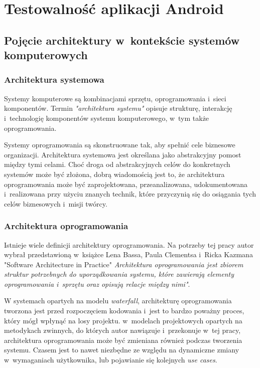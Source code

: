 \chapter{Testowalność aplikacji Android}
\label{opis_problemu}

\section{Pojęcie architektury w~kontekście systemów \newline komputerowych}
\subsection{Architektura systemowa}
Systemy komputerowe są kombinacjami sprzętu, oprogramowania i~sieci komponentów. Termin \textit{"architektura systemu"} opisuje strukturę, interakcję i~technologię komponentów systemu komputerowego, w~tym także oprogramowania.

Systemy oprogramowania są skonstruowane tak, aby spełnić cele biznesowe organizacji. Architektura systemowa jest określana jako abstrakcyjny pomost między tymi celami. Choć droga od abstrakcyjnych celów do konkretnych systemów może być złożona, dobrą wiadomością jest to, że architektura oprogramowania może być zaprojektowana, przeanalizowana, udokumentowana i~realizowana przy użyciu znanych technik, które przyczynią się do osiągania tych celów biznesowych i~misji twórcy. 


\subsection{Architektura oprogramowania}
Istnieje wiele definicji architektury oprogramowania. Na potrzeby tej pracy autor wybrał przedstawioną w~książce Lena Bassa, Paula Clementsa i~Ricka Kazmana "Software Architecture in Practice"\cite{bib:architect:software} \textit{Architektura oprogramowania jest zbiorem struktur potrzebnych do uporządkowania systemu, które zawierają elementy oprogramowania i~sprzętu oraz opisują relacje między nimi"}. 

W systemach opartych na modelu \textit{waterfall}, architekturę oprogramowania tworzona jest przed rozpoczęciem kodowania i~jest to bardzo poważny proces, który mógł wpłynąć na losy projektu. w~modelach projektowych opartych na metodykach zwinnych, do których autor nawiązuje i~przekonuje w~tej pracy, architektura oprogramowania może być zmieniana również podczas tworzenia systemu. Czasem jest to nawet niezbędne ze względu na dynamiczne zmiany w~wymaganiach użytkownika, lub pojawianie się kolejnych \textit{use cases}.


